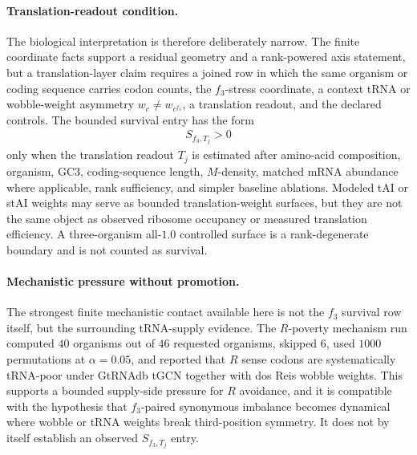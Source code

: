 \paragraph{Translation-readout condition.}
The biological interpretation is therefore deliberately narrow.  The finite coordinate facts support a residual geometry and a rank-powered axis statement, but a translation-layer claim requires a joined row in which the same organism or coding sequence carries codon counts, the $f_3$-stress coordinate, a context tRNA or wobble-weight asymmetry $w_c \ne w_{c^{f_3}}$, a translation readout, and the declared controls.  The bounded survival entry has the form
$$
\begin{aligned}
S_{f_3,T_j} > 0
\end{aligned}
$$
only when the translation readout $T_j$ is estimated after amino-acid composition, organism, GC3, coding-sequence length, $M$-density, matched mRNA abundance where applicable, rank sufficiency, and simpler baseline ablations.  Modeled tAI or stAI weights may serve as bounded translation-weight surfaces, but they are not the same object as observed ribosome occupancy or measured translation efficiency.  A three-organism all-$1.0$ controlled surface is a rank-degenerate boundary and is not counted as survival.

\paragraph{Mechanistic pressure without promotion.}
The strongest finite mechanistic contact available here is not the $f_3$ survival row itself, but the surrounding tRNA-supply evidence.  The $R$-poverty mechanism run computed $40$ organisms out of $46$ requested organisms, skipped $6$, used $1000$ permutations at $\alpha=0.05$, and reported that $R$ sense codons are systematically tRNA-poor under GtRNAdb tGCN together with dos Reis wobble weights.  This supports a bounded supply-side pressure for $R$ avoidance, and it is compatible with the hypothesis that $f_3$-paired synonymous imbalance becomes dynamical where wobble or tRNA weights break third-position symmetry.  It does not by itself establish an observed $S_{f_3,T_j}$ entry.

